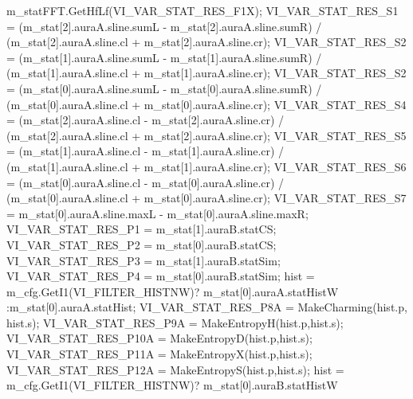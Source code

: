 \begin{DoxyCompactItemize}
m\+\_\+stat\+F\+F\+T.\+Get\+Hf\+Lf(\+V\+I\+\_\+\+V\+A\+R\+\_\+\+S\+T\+A\+T\+\_\+\+R\+E\+S\+\_\+\+F1\+X); V\+I\+\_\+\+V\+A\+R\+\_\+\+S\+T\+A\+T\+\_\+\+R\+E\+S\+\_\+\+S1 = (m\+\_\+stat\mbox{[}2\mbox{]}.aura\+A.\+sline.\+sum\+L -\/ m\+\_\+stat\mbox{[}2\mbox{]}.aura\+A.\+sline.\+sum\+R) / (m\+\_\+stat\mbox{[}2\mbox{]}.aura\+A.\+sline.\+cl + m\+\_\+stat\mbox{[}2\mbox{]}.aura\+A.\+sline.\+cr); V\+I\+\_\+\+V\+A\+R\+\_\+\+S\+T\+A\+T\+\_\+\+R\+E\+S\+\_\+\+S2 = (m\+\_\+stat\mbox{[}1\mbox{]}.aura\+A.\+sline.\+sum\+L -\/ m\+\_\+stat\mbox{[}1\mbox{]}.aura\+A.\+sline.\+sum\+R) / (m\+\_\+stat\mbox{[}1\mbox{]}.aura\+A.\+sline.\+cl + m\+\_\+stat\mbox{[}1\mbox{]}.aura\+A.\+sline.\+cr); V\+I\+\_\+\+V\+A\+R\+\_\+\+S\+T\+A\+T\+\_\+\+R\+E\+S\+\_\+\+S2 = (m\+\_\+stat\mbox{[}0\mbox{]}.aura\+A.\+sline.\+sum\+L -\/ m\+\_\+stat\mbox{[}0\mbox{]}.aura\+A.\+sline.\+sum\+R) / (m\+\_\+stat\mbox{[}0\mbox{]}.aura\+A.\+sline.\+cl + m\+\_\+stat\mbox{[}0\mbox{]}.aura\+A.\+sline.\+cr); V\+I\+\_\+\+V\+A\+R\+\_\+\+S\+T\+A\+T\+\_\+\+R\+E\+S\+\_\+\+S4 = (m\+\_\+stat\mbox{[}2\mbox{]}.aura\+A.\+sline.\+cl -\/ m\+\_\+stat\mbox{[}2\mbox{]}.aura\+A.\+sline.\+cr) / (m\+\_\+stat\mbox{[}2\mbox{]}.aura\+A.\+sline.\+cl + m\+\_\+stat\mbox{[}2\mbox{]}.aura\+A.\+sline.\+cr); V\+I\+\_\+\+V\+A\+R\+\_\+\+S\+T\+A\+T\+\_\+\+R\+E\+S\+\_\+\+S5 = (m\+\_\+stat\mbox{[}1\mbox{]}.aura\+A.\+sline.\+cl -\/ m\+\_\+stat\mbox{[}1\mbox{]}.aura\+A.\+sline.\+cr) / (m\+\_\+stat\mbox{[}1\mbox{]}.aura\+A.\+sline.\+cl + m\+\_\+stat\mbox{[}1\mbox{]}.aura\+A.\+sline.\+cr); V\+I\+\_\+\+V\+A\+R\+\_\+\+S\+T\+A\+T\+\_\+\+R\+E\+S\+\_\+\+S6 = (m\+\_\+stat\mbox{[}0\mbox{]}.aura\+A.\+sline.\+cl -\/ m\+\_\+stat\mbox{[}0\mbox{]}.aura\+A.\+sline.\+cr) / (m\+\_\+stat\mbox{[}0\mbox{]}.aura\+A.\+sline.\+cl + m\+\_\+stat\mbox{[}0\mbox{]}.aura\+A.\+sline.\+cr); V\+I\+\_\+\+V\+A\+R\+\_\+\+S\+T\+A\+T\+\_\+\+R\+E\+S\+\_\+\+S7 = m\+\_\+stat\mbox{[}0\mbox{]}.aura\+A.\+sline.\+max\+L -\/ m\+\_\+stat\mbox{[}0\mbox{]}.aura\+A.\+sline.\+max\+R; V\+I\+\_\+\+V\+A\+R\+\_\+\+S\+T\+A\+T\+\_\+\+R\+E\+S\+\_\+\+P1 = m\+\_\+stat\mbox{[}1\mbox{]}.aura\+B.\+stat\+C\+S; V\+I\+\_\+\+V\+A\+R\+\_\+\+S\+T\+A\+T\+\_\+\+R\+E\+S\+\_\+\+P2 = m\+\_\+stat\mbox{[}0\mbox{]}.aura\+B.\+stat\+C\+S; V\+I\+\_\+\+V\+A\+R\+\_\+\+S\+T\+A\+T\+\_\+\+R\+E\+S\+\_\+\+P3 = m\+\_\+stat\mbox{[}1\mbox{]}.aura\+B.\+stat\+Sim; V\+I\+\_\+\+V\+A\+R\+\_\+\+S\+T\+A\+T\+\_\+\+R\+E\+S\+\_\+\+P4 = m\+\_\+stat\mbox{[}0\mbox{]}.aura\+B.\+stat\+Sim; hist = m\+\_\+cfg.\+Get\+I1(\+V\+I\+\_\+\+F\+I\+L\+T\+E\+R\+\_\+\+H\+I\+S\+T\+N\+W)? m\+\_\+stat\mbox{[}0\mbox{]}.aura\+A.\+stat\+Hist\+W \+:m\+\_\+stat\mbox{[}0\mbox{]}.aura\+A.\+stat\+Hist; V\+I\+\_\+\+V\+A\+R\+\_\+\+S\+T\+A\+T\+\_\+\+R\+E\+S\+\_\+\+P8\+A = Make\+Charming(hist.\+p, hist.\+s); V\+I\+\_\+\+V\+A\+R\+\_\+\+S\+T\+A\+T\+\_\+\+R\+E\+S\+\_\+\+P9\+A = Make\+Entropy\+H(hist.\+p,hist.\+s); V\+I\+\_\+\+V\+A\+R\+\_\+\+S\+T\+A\+T\+\_\+\+R\+E\+S\+\_\+\+P10\+A = Make\+Entropy\+D(hist.\+p,hist.\+s); V\+I\+\_\+\+V\+A\+R\+\_\+\+S\+T\+A\+T\+\_\+\+R\+E\+S\+\_\+\+P11\+A = Make\+Entropy\+X(hist.\+p,hist.\+s); V\+I\+\_\+\+V\+A\+R\+\_\+\+S\+T\+A\+T\+\_\+\+R\+E\+S\+\_\+\+P12\+A = Make\+Entropy\+S(hist.\+p,hist.\+s); hist = m\+\_\+cfg.\+Get\+I1(\+V\+I\+\_\+\+F\+I\+L\+T\+E\+R\+\_\+\+H\+I\+S\+T\+N\+W)? m\+\_\+stat\mbox{[}0\mbox{]}.aura\+B.\+stat\+Hist\+W 
\end{DoxyCompactItemize}
